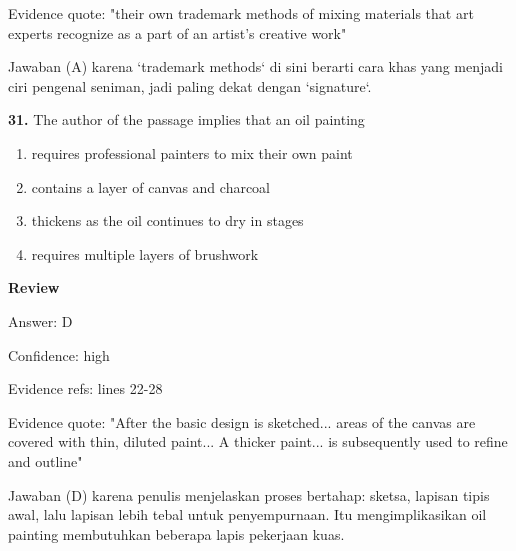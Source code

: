 \documentclass[12pt]{article}
\begin{document}
Evidence quote: "their own trademark methods of mixing materials that art experts recognize as a part of an artist's creative work"\par
Jawaban (A) karena `trademark methods` di sini berarti cara khas yang menjadi ciri pengenal seniman, jadi paling dekat dengan `signature`.\par
\endgroup
\par
\vspace{0.25\baselineskip}
\noindent\textbf{31.} The author of the passage implies that an oil painting
\begin{enumerate}[label=(\Alph*),leftmargin=*,itemsep=0.2em]
\item requires professional painters to mix their own paint
\item contains a layer of canvas and charcoal
\item thickens as the oil continues to dry in stages
\item requires multiple layers of brushwork
\end{enumerate}
\par
\begingroup
\setlength{\parskip}{0pt}
\setlength{\parindent}{0pt}
\textbf{Review}\par
Answer: D\par
Confidence: high\par
Evidence refs: lines 22-28\par
Evidence quote: "After the basic design is sketched... areas of the canvas are covered with thin, diluted paint... A thicker paint... is subsequently used to refine and outline"\par
Jawaban (D) karena penulis menjelaskan proses bertahap: sketsa, lapisan tipis awal, lalu lapisan lebih tebal untuk penyempurnaan. Itu mengimplikasikan oil painting membutuhkan beberapa lapis pekerjaan kuas.\par
\endgroup
\par
\vspace{0.25\baselineskip}
\end{document}
